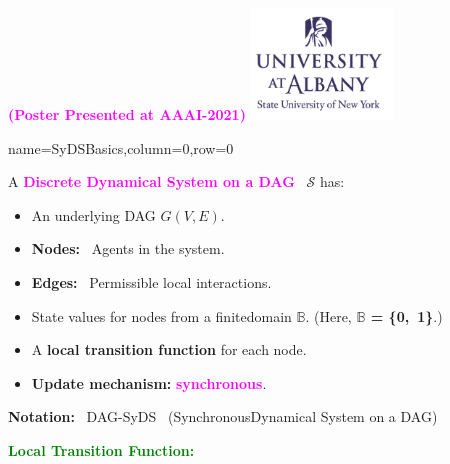 \documentclass[landscape,a0paper,fontscale=0.285]{baposter} %
\newcommand{\compresslist}{ %
\setlength{\itemsep}{1pt}
\setlength{\parskip}{0pt}
\setlength{\parsep}{0pt}
}
\newcommand{\cals}{\mbox{$\mathcal{S}$}}
\newcommand{\bbb}{\mbox{$\mathbb{B}$}}
\begin{document}
\begin{poster}
{            \textcolor{magenta}{
               \textbf{(Poster Presented at  AAAI-2021)}}
            } %
{\includegraphics[height=8em]{ualbany_logo.png}} 

          {name=SyDSBasics,column=0,row=0}{
A \textcolor{magenta}{
\textbf{Discrete Dynamical System on a DAG}} ~\cals{} has:

\smallskip

\begin{itemize}[leftmargin=*,noitemsep,topsep=0pt]
\compresslist
\item An underlying DAG $G(V,E)$.  
\item \textbf{Nodes:}~ Agents in the system. 
\item \textbf{Edges:}~ Permissible local interactions.  
\item State values for nodes from a finite\newline domain \bbb{}.
      (Here, \textcolor{dgreen}{\textbf{\bbb{} = \{0,~1\}}}.) 
\item A \textbf{local transition function} for each node.
\item \textbf{Update mechanism:} \textcolor{magenta}{\textbf{synchronous}}.
\end{itemize}

\medskip

\noindent
\textbf{Notation:}~ DAG-SyDS~ (Synchronous\newline Dynamical System on a DAG)

\medskip

\noindent
\textcolor{green}{\textbf{Local Transition Function:}}

\medskip

}
\end{poster}
\end{document}
